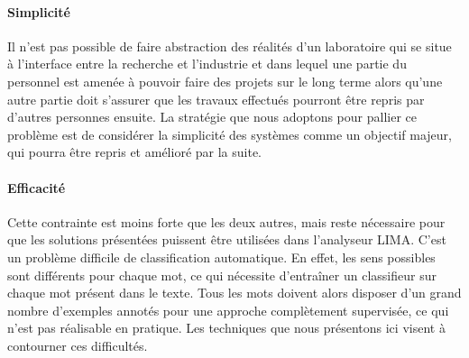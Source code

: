\paragraph{Simplicité} Il n'est pas possible de faire abstraction des réalités
d'un laboratoire qui se situe à l'interface entre la recherche et l'industrie
et dans lequel une partie du personnel est amenée à pouvoir faire des projets
sur le long terme alors qu'une autre partie doit s'assurer que les travaux
effectués pourront être repris par d'autres personnes ensuite. La stratégie que
nous adoptons pour pallier ce problème est de considérer la simplicité des
systèmes comme un objectif majeur, qui pourra être repris et amélioré par la
suite.

\paragraph{Efficacité} Cette contrainte est moins forte que les deux autres,
mais reste nécessaire pour que les solutions présentées puissent être
utilisées dans l'analyseur LIMA.  C'est un problème difficile de
classification automatique. En effet, les sens possibles sont différents pour
chaque mot, ce qui nécessite d'entraîner un classifieur sur chaque mot présent
dans le texte. Tous les mots doivent alors disposer d'un grand nombre
d'exemples annotés pour une approche complètement supervisée, ce qui n'est pas
réalisable en pratique. Les techniques que nous présentons ici visent à
contourner ces difficultés.

